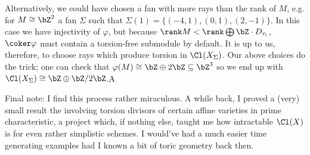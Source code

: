 \begin{homework}[e]
\begin{prf}
		Alternatively, we could have chosen a fan with more rays than the rank of $M$, e.g. for $M \cong \bZ^2$ a fan $\Sigma$ such that $\Sigma(1) = \{(-4,1),(0,1),(2,-1)\}$. In this case we have injectivity of $\varphi$, but because $\rank M < \rank \bigoplus \bZ\cdot D_{\tau_i}$, $\coker \varphi$ must contain a torsion-free submodule by default. It is up to us, therefore, to choose rays which produce torsion in $\Cl(X_\Sigma)$. Our above choices do the trick; one can check that $\varphi(M) \cong \bZ \oplus 2\bZ \subseteq \bZ^3$ so we end up with $\Cl(X_\Sigma) \cong \bZ \oplus \bZ/2\bZ$.A

		\bigskip

		Final note: I find this process rather miraculous. A while back, I proved a (very) small result the involving torsion divisors of certain affine varieties in prime characteristic, a project which, if nothing else, taught me how intractable $\Cl(X)$ is for even rather simplistic schemes. I would've had a much easier time generating examples had I known a bit of toric geometry back then.
	\end{prf}
\end{homework}

